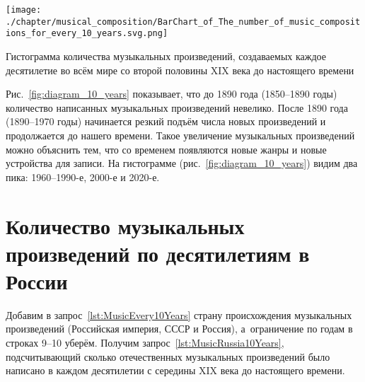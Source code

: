 \newpage
\begin{marginfigure}[-5\baselineskip]
    \texttt{[image: ./chapter/musical\_composition/BarChart\_of\_The\_number\_of\_music\_compositions\_for\_every\_10\_years.svg.png]}
    \vspace{-7pt}
	\caption{Гистограмма количества музыкальных произведений, 
             создаваемых каждое десятилетие во всём мире со второй половины XIX века до настоящего времени}%
	\label{fig:diagram_10_years}%
\end{marginfigure}
%
Рис.~\ref{fig:diagram_10_years} показывает, что до 1890 года (1850--1890 годы) 
количество написанных музыкальных произведений невелико. 
После 1890 года (1890--1970 годы) начинается резкий подъём числа новых произведений 
и продолжается до нашего времени. 
Такое увеличение музыкальных произведений можно объяснить тем, 
что со временем появляются новые жанры и новые устройства для записи. 
На гистограмме (рис.~\ref{fig:diagram_10_years}) видим два пика: 1960--1990-е, 2000-е и 2020-е.




\section{Количество музыкальных произведений по десятилетиям в России}

Добавим в запрос~\ref{lst:MusicEvery10Years} страну происхождения 
музыкальных произведений (Российская империя, СССР и Россия), 
а~ограничение по годам в строках 9--10 уберём. 
Получим запрос~\ref{lst:MusicRussia10Years}, 
подсчитывающий сколько отечественных музыкальных произведений было написано 
в каждом десятилетии с середины XIX века до настоящего времени.

